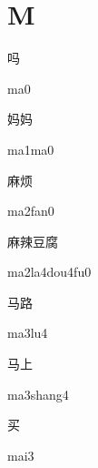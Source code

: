 ﻿%
\section*{M}

\begin{verbete}[ma0]{吗}
\begin{pronuncia}{ma0}
\end{pronuncia}
\end{verbete}

\begin{verbete}[ma1ma0]{妈妈}
\begin{pronuncia}{ma1ma0}
\end{pronuncia}
\end{verbete}

\begin{verbete}[ma2fan0]{麻烦}
\begin{pronuncia}{ma2fan0}
\end{pronuncia}
\end{verbete}

\begin{verbete}[ma2la4dou4fu0]{麻辣豆腐}
\begin{pronuncia}{ma2la4dou4fu0}
\end{pronuncia}
\end{verbete}

\begin{verbete}[ma3lu4]{马路}
\begin{pronuncia}{ma3lu4}
\end{pronuncia}
\end{verbete}

\begin{verbete}[ma3shang4]{马上}
\begin{pronuncia}{ma3shang4}
\end{pronuncia}
\end{verbete}

\begin{verbete}[mai3]{买}
\begin{pronuncia}{mai3}
\end{pronuncia}
\end{verbete}

